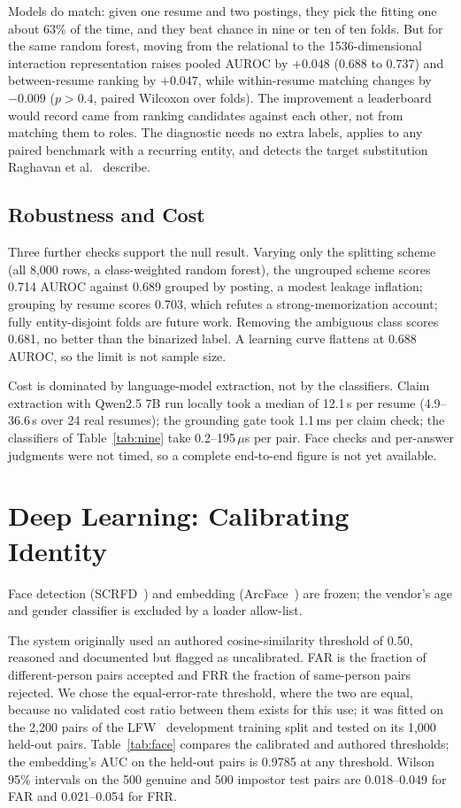 \documentclass[conference,a4paper]{IEEEtran}
\begin{document}
Models do match: given one resume and two postings, they pick the fitting
one about 63\% of the time, and they beat chance in nine or ten of ten folds.
But for the same random forest, moving from the relational to the
1536-dimensional interaction representation raises pooled AUROC by $+0.048$
(0.688 to 0.737) and between-resume ranking by $+0.047$, while
within-resume matching changes by $-0.009$ ($p > 0.4$, paired Wilcoxon over
folds). The improvement a leaderboard would record came from ranking candidates
against each other, not from matching them to roles. The diagnostic needs no extra labels, applies
to any paired benchmark with a recurring entity, and detects the target
substitution Raghavan et al.~\cite{raghavan2020} describe.

\subsection{Robustness and Cost}
Three further checks support the null result. Varying only the splitting
scheme (all 8,000 rows, a class-weighted random forest), the ungrouped scheme
scores 0.714 AUROC against 0.689 grouped by posting, a modest leakage
inflation; grouping by resume scores 0.703, which refutes a
strong-memorization account; fully entity-disjoint folds are future work. Removing the ambiguous class scores 0.681, no
better than the binarized label. A learning curve flattens at 0.688 AUROC, so the limit is not sample size.

Cost is dominated by language-model extraction, not by the classifiers. Claim
extraction with Qwen2.5 7B run locally took a median of 12.1\,s per resume
(4.9--36.6\,s over 24 real resumes); the grounding gate took 1.1\,ms per claim
check; the classifiers of Table~\ref{tab:nine} take 0.2--195\,$\mu$s per pair.
Face checks and per-answer judgments were not timed, so a complete end-to-end
figure is not yet available.

\section{Deep Learning: Calibrating Identity}
\label{sec:dl}
Face detection (SCRFD~\cite{guo2022}) and embedding
(\mbox{ArcFace}~\cite{deng2019}) are frozen; the vendor's age and gender
classifier is excluded by a loader allow-list.

The system originally used an authored cosine-similarity threshold of 0.50,
reasoned and documented but flagged as uncalibrated. FAR is the fraction of
different-person pairs accepted and FRR the fraction of same-person pairs
rejected. We chose the equal-error-rate threshold, where the two are equal,
because no validated cost ratio between them exists for this use; it was fitted
on the 2,200 pairs of the LFW~\cite{huang2007} development training split and
tested on its 1,000 held-out pairs. Table~\ref{tab:face} compares the
calibrated and authored thresholds; the embedding's AUC on the held-out pairs
is 0.9785 at any threshold. Wilson 95\% intervals on the 500 genuine and 500
impostor test pairs are 0.018--0.049 for FAR and 0.021--0.054 for FRR.
\end{document}
